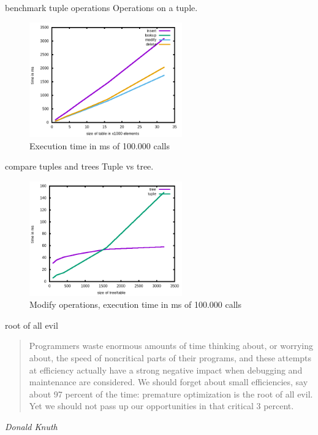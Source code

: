 \begin{frame}{benchmark tuple operations}
 Operations on a tuple.
 \begin{figure}
  \centering
  \includegraphics[height=140pt]{tuple.png}
  \caption{Execution time in ms of 100.000 calls}
 \end{figure}

\end{frame}



\begin{frame}{compare tuples and trees}
 Tuple vs tree.
 \begin{figure}
  \centering
  \includegraphics[height=140pt]{bench.png}
  \caption{Modify operations, execution time in ms of 100.000 calls}
 \end{figure}

\end{frame}

\begin{frame}{root of all evil}

\begin{quote}
Programmers waste enormous amounts of time thinking about, or
worrying about, the speed of noncritical parts of their programs, and
these attempts at efficiency actually have a strong negative impact
when debugging and maintenance are considered. We should forget about
small efficiencies, say about 97 percent of the time: premature
optimization is the root of all evil. Yet we should not pass up our
opportunities in that critical 3 percent.
\end{quote}

 {\em Donald Knuth}


\end {frame}

